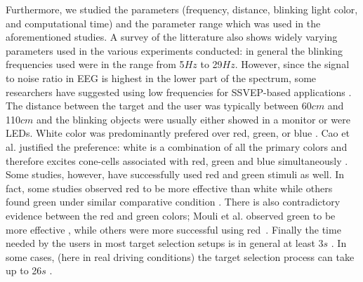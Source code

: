 \documentclass[smallextended]{svjour3}
\begin{document}
Furthermore, we studied the parameters (frequency, distance, blinking light color, and computational time) and the parameter range which was used in the aforementioned studies.
A survey of the litterature also shows widely varying parameters used in the various experiments conducted:
in general the blinking frequencies used were in the range from 5$Hz$ to 29$Hz$.
However, since the signal to noise ratio in EEG is highest in the lower part of the spectrum, some researchers have suggested using low frequencies for SSVEP-based applications \cite{paper6}.
The distance between the target and the user was typically between 60$cm$ and 110$cm$ and the blinking objects were usually either showed in a monitor or were LEDs. White color was predominantly prefered over red, green, or blue \cite{paper6,aljshamee2014beyond,aljshamee2016discriminate,cao2012flashing,paper2}. Cao et al. justified the preference: white is a combination of all the primary colors and therefore excites cone-cells associated with red, green and blue simultaneously \cite{cao2012flashing}. Some studies, however, have successfully used red \cite{paper_5,jian2014improving,paper4} and green \cite{chua2004effects,duvinage2013performance,SSVEPfiability,hvaring2014comparison,paper4,mouli2013performance} stimuli as well.
In fact, some studies observed red to be more effective than white \cite{paper_5,hvaring2014comparison} while others found green under similar comparative condition \cite{chua2004effects,duvinage2013performance}. There is also contradictory evidence between the red and green colors; Mouli et al. observed green to be more effective \cite{mouli2013performance}, while others were more successful using red~\cite{cao2012flashing}.
Finally the time needed by the users in most target selection setups is in general at least 3$s$ \cite{car,SSVEPfiability,jian2014improving,paper4}.
In some cases, (here in real driving conditions) the target selection process can take up to 26$s$ \cite{car}.
\end{document}
